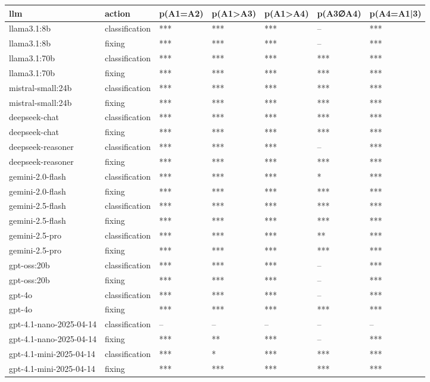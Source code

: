 \begin{table}[!t]
\centering\scriptsize
\begin{tabular}{lllllll}
\toprule
llm & action & p(A1=A2) & p(A1>A3) & p(A1>A4) & p(A3∅A4) & p(A4=A1|3) \\
\midrule
llama3.1:8b & classification & *** & *** & *** & -- & *** \\
llama3.1:8b & fixing & *** & *** & *** & -- & *** \\
llama3.1:70b & classification & *** & *** & *** & *** & *** \\
llama3.1:70b & fixing & *** & *** & *** & *** & *** \\
mistral-small:24b & classification & *** & *** & *** & *** & *** \\
mistral-small:24b & fixing & *** & *** & *** & *** & *** \\
deepseek-chat & classification & *** & *** & *** & *** & *** \\
deepseek-chat & fixing & *** & *** & *** & *** & *** \\
deepseek-reasoner & classification & *** & *** & *** & -- & *** \\
deepseek-reasoner & fixing & *** & *** & *** & *** & *** \\
gemini-2.0-flash & classification & *** & *** & *** & * & *** \\
gemini-2.0-flash & fixing & *** & *** & *** & *** & *** \\
gemini-2.5-flash & classification & *** & *** & *** & *** & *** \\
gemini-2.5-flash & fixing & *** & *** & *** & *** & *** \\
gemini-2.5-pro & classification & *** & *** & *** & ** & *** \\
gemini-2.5-pro & fixing & *** & *** & *** & *** & *** \\
gpt-oss:20b & classification & *** & *** & *** & -- & *** \\
gpt-oss:20b & fixing & *** & *** & *** & -- & *** \\
gpt-4o & classification & *** & *** & *** & -- & *** \\
gpt-4o & fixing & *** & *** & *** & *** & *** \\
gpt-4.1-nano-2025-04-14 & classification & -- & -- & -- & -- & -- \\
gpt-4.1-nano-2025-04-14 & fixing & *** & ** & *** & -- & *** \\
gpt-4.1-mini-2025-04-14 & classification & *** & * & *** & *** & *** \\
gpt-4.1-mini-2025-04-14 & fixing & *** & *** & *** & *** & *** \\

\end{tabular}
\end{table}
